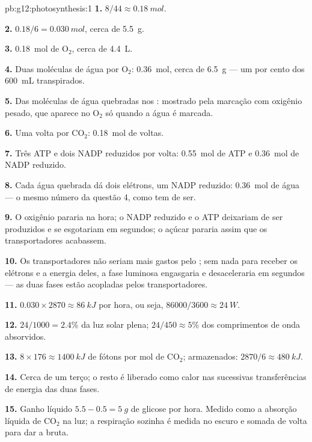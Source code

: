 \begin{solution}{pb:g12:photosynthesis:1}
\textbf{1.} $8/44 \approx \qty{0.18}{mol}$.

\textbf{2.} $0.18/6 = \qty{0.030}{mol}$, cerca de \qty{5.5}{g}.

\textbf{3.} \qty{0.18}{mol} de $\mathrm{O_2}$, cerca de \qty{4.4}{L}.

\textbf{4.} Duas moléculas de água por $\mathrm{O_2}$: \qty{0.36}{mol},
cerca de \qty{6.5}{g} --- um por cento dos \qty{600}{mL} transpirados.

\textbf{5.} Das moléculas de água quebradas nos : mostrado
pela marcação com oxigênio pesado, que aparece no $\mathrm{O_2}$ só
quando a água é marcada.

\textbf{6.} Uma volta por $\mathrm{CO_2}$: \qty{0.18}{mol} de voltas.

\textbf{7.} Três ATP e dois NADP reduzidos por volta: \qty{0.55}{mol}
de ATP e \qty{0.36}{mol} de NADP reduzido.

\textbf{8.} Cada água quebrada dá dois elétrons, um NADP reduzido:
\qty{0.36}{mol} de água --- o mesmo número da questão 4, como tem de ser.

\textbf{9.} O oxigênio pararia na hora; o NADP reduzido e o ATP
deixariam de ser produzidos e se esgotariam em segundos; o açúcar
pararia assim que os transportadores acabassem.

\textbf{10.} Os transportadores não seriam mais gastos pelo ; sem nada para receber os elétrons e a energia deles, a fase
luminosa engasgaria e desaceleraria em segundos --- as duas fases estão
acopladas pelos transportadores.

\textbf{11.} $0.030 \times 2870 \approx \qty{86}{kJ}$ por hora, ou
seja, $86000/3600 \approx \qty{24}{W}$.

\textbf{12.} $24/1000 = 2.4\%$ da luz solar plena; $24/450 \approx
5\%$ dos comprimentos de onda absorvidos.

\textbf{13.} $8 \times 176 \approx \qty{1400}{kJ}$ de fótons por mol de
$\mathrm{CO_2}$; armazenados: $2870/6 \approx \qty{480}{kJ}$.

\textbf{14.} Cerca de um terço; o resto é liberado como calor nas
sucessivas transferências de energia das duas fases.

\textbf{15.} Ganho líquido $5.5 - 0.5 = \qty{5}{g}$ de glicose por
hora. Medido como a absorção líquida de $\mathrm{CO_2}$ na luz; a
respiração sozinha é medida no escuro e somada de volta para dar a
 bruta.


\end{solution}
